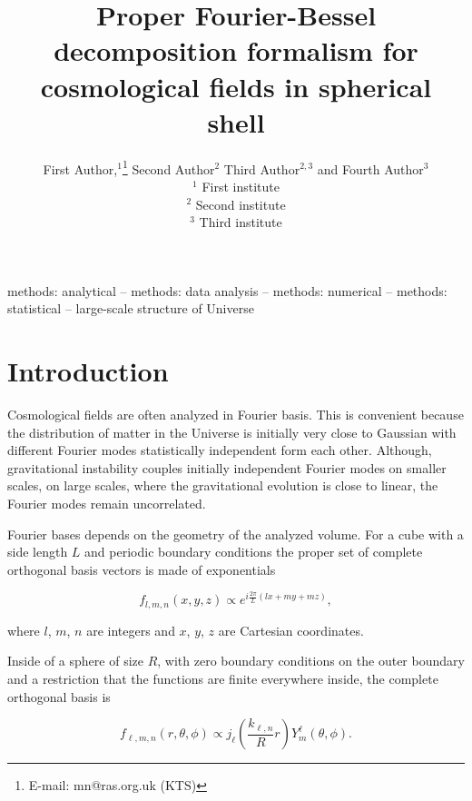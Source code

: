 \documentclass[fleqn,usenatbib]{mnras}
\title[Basis for spherical shells]{Proper Fourier-Bessel decomposition formalism for cosmological fields in spherical shell}
\author[First Author et al.]{
First Author,$^{1}$\thanks{E-mail: mn@ras.org.uk (KTS)}
Second Author$^{2}$
Third Author$^{2,3}$
and Fourth Author$^{3}$
\\
$^{1}$ First institute\\
$^{2}$ Second institute\\
$^{3}$ Third institute
}
\begin{document}
\label{firstpage}
\pagerange{\pageref{firstpage}--\pageref{lastpage}}
\maketitle

\begin{abstract}
\end{abstract}

\begin{keywords}
methods: analytical -- methods: data analysis -- methods: numerical -- methods: statistical -- large-scale structure of Universe
\end{keywords}



\section{Introduction}

Cosmological fields are often analyzed in Fourier basis. This is convenient
because the distribution of matter in the Universe is initially very close to
Gaussian with different Fourier modes statistically independent form each other.
Although, gravitational instability couples initially independent Fourier modes
on smaller scales, on large scales, where the gravitational evolution is close
to linear, the Fourier modes remain uncorrelated.

Fourier bases depends on the geometry of the analyzed volume. For a cube with a
side length $L$ and  periodic boundary conditions the proper set of complete
orthogonal basis vectors is made of exponentials 

\begin{equation}
\label{eq:Fcube}
f_{l,m,n}(x,y,z)\propto e^{i\frac{2\pi}{L}\left(lx + my + mz\right)},
\end{equation}

where $l$, $m$, $n$ are integers and $x$, $y$, $z$ are Cartesian coordinates.

Inside of a sphere of size $R$, with zero boundary conditions on the outer
boundary and a restriction that the functions are finite everywhere inside, the
complete orthogonal basis is

\begin{equation}
\label{eq:Fsphere}
f_{\ell,m,n}(r,\theta,\phi) \propto j_\ell\left(\frac{k_{\ell,n}} {R}r\right)Y^\ell_m
(\theta,\phi).
\end{equation}
\end{document}
